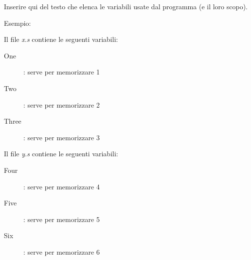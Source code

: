 \documentclass[../Relazione.tex]{subfiles}
\begin{document}
Inserire qui del testo che elenca le variabili usate
dal programma (e il loro scopo).

Esempio:

Il file \textit{x.s} contiene le seguenti variabili:

\begin{description}
    \item [One]: serve per memorizzare 1
    \item [Two]: serve per memorizzare 2
    \item [Three]: serve per memorizzare 3
\end{description}

Il file \textit{y.s} contiene le seguenti variabili:

\begin{description}
    \item [Four]: serve per memorizzare 4
    \item [Five]: serve per memorizzare 5
    \item [Six]: serve per memorizzare 6
\end{description}
\end{document}
